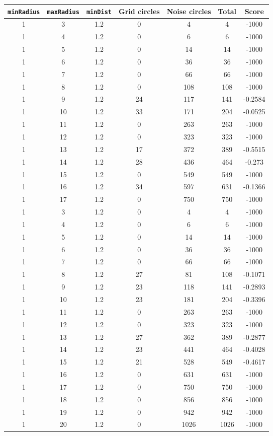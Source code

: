 \documentclass[letterpaper, 12pt]{article}
\begin{document}
\begin{longtable}{|c|c|c|c|c|c|c|}
\hline
\textbf{\texttt{minRadius}} & \textbf{\texttt{maxRadius}} & \textbf{\texttt{minDist}} & \textbf{Grid circles} & \textbf{Noise circles} & \textbf{Total} & \textbf{Score} \\
\hline
1 & 3 & 1.2 & 0 & 4 & 4 & -1000 \\
\hline
1 & 4 & 1.2 & 0 & 6 & 6 & -1000 \\
\hline
1 & 5 & 1.2 & 0 & 14 & 14 & -1000 \\
\hline
1 & 6 & 1.2 & 0 & 36 & 36 & -1000 \\
\hline
1 & 7 & 1.2 & 0 & 66 & 66 & -1000 \\
\hline
1 & 8 & 1.2 & 0 & 108 & 108 & -1000 \\
\hline
1 & 9 & 1.2 & 24 & 117 & 141 & -0.2584 \\
\hline
1 & 10 & 1.2 & 33 & 171 & 204 & -0.0525 \\
\hline
1 & 11 & 1.2 & 0 & 263 & 263 & -1000 \\
\hline
1 & 12 & 1.2 & 0 & 323 & 323 & -1000 \\
\hline
1 & 13 & 1.2 & 17 & 372 & 389 & -0.5515 \\
\hline
1 & 14 & 1.2 & 28 & 436 & 464 & -0.273 \\
\hline
1 & 15 & 1.2 & 0 & 549 & 549 & -1000 \\
\hline
1 & 16 & 1.2 & 34 & 597 & 631 & -0.1366 \\
\hline
1 & 17 & 1.2 & 0 & 750 & 750 & -1000 \\
\hline
1 & 3 & 1.2 & 0 & 4 & 4 & -1000 \\
\hline
1 & 4 & 1.2 & 0 & 6 & 6 & -1000 \\
\hline
1 & 5 & 1.2 & 0 & 14 & 14 & -1000 \\
\hline
1 & 6 & 1.2 & 0 & 36 & 36 & -1000 \\
\hline
1 & 7 & 1.2 & 0 & 66 & 66 & -1000 \\
\hline
1 & 8 & 1.2 & 27 & 81 & 108 & -0.1071 \\
\hline
1 & 9 & 1.2 & 23 & 118 & 141 & -0.2893 \\
\hline
1 & 10 & 1.2 & 23 & 181 & 204 & -0.3396 \\
\hline
1 & 11 & 1.2 & 0 & 263 & 263 & -1000 \\
\hline
1 & 12 & 1.2 & 0 & 323 & 323 & -1000 \\
\hline
1 & 13 & 1.2 & 27 & 362 & 389 & -0.2877 \\
\hline
1 & 14 & 1.2 & 23 & 441 & 464 & -0.4028 \\
\hline
1 & 15 & 1.2 & 21 & 528 & 549 & -0.4617 \\
\hline
1 & 16 & 1.2 & 0 & 631 & 631 & -1000 \\
\hline
1 & 17 & 1.2 & 0 & 750 & 750 & -1000 \\
\hline
1 & 18 & 1.2 & 0 & 856 & 856 & -1000 \\
\hline
1 & 19 & 1.2 & 0 & 942 & 942 & -1000 \\
\hline
1 & 20 & 1.2 & 0 & 1026 & 1026 & -1000 \\
\hline
\end{longtable}
\end{document}
